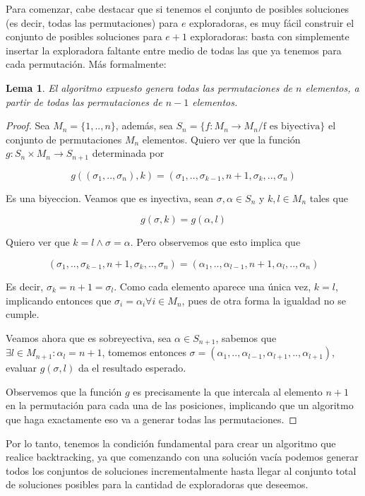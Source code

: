 \documentclass{article}
\newtheorem{lemma}{Lema}[theorem]
\theoremstyle{definition}
\theoremstyle{remark}
\begin{document}
Para comenzar, cabe destacar que si tenemos el conjunto de posibles soluciones (es decir, todas las permutaciones) para $e$ exploradoras, es muy fácil construir el conjunto de posibles soluciones para $e+1$ exploradoras: basta con simplemente insertar la exploradora faltante entre medio de todas las que ya tenemos para cada permutación. Más formalmente:

\begin{lemma}
El algoritmo expuesto genera todas las permutaciones de $n$ elementos, a partir de todas las permutaciones de $n-1$ elementos.
\end{lemma}

\begin{proof}
Sea $M_n = \{1, .., n\}$, además, sea $S_n = \{ f : M_n \to M_n / \text{f es biyectiva}\}$ el conjunto de permutaciones $M_n$ elementos. Quiero ver que la función $g : S_n \times M_n \to S_{n+1}$ determinada por

$$g((\sigma_1, .., \sigma_n), k) = (\sigma_1, .., \sigma_{k-1}, n+1, \sigma_k, .., \sigma_n)$$

Es una biyeccion. Veamos que es inyectiva, sean $\sigma, \alpha \in S_n$ y $k, l \in M_n$ tales que

$$g(\sigma, k) = g(\alpha, l)$$

Quiero ver que $k = l \wedge \sigma = \alpha$. Pero observemos que esto implica que

$$(\sigma_1, .., \sigma_{k-1}, n+1, \sigma_k, .., \sigma_n) = (\alpha_1, .., \alpha_{l-1}, n+1, \alpha_l, .., \alpha_n)$$

Es decir, $\sigma_k = n + 1 = \sigma_l$. Como cada elemento aparece una única vez, $k = l$, implicando entonces que $\sigma_i = \alpha_i \forall i \in M_n$, pues de otra forma la igualdad no se cumple.

Veamos ahora que es sobreyectiva, sea $\alpha \in S_{n+1}$, sabemos que $\exists l \in M_{n+1} : \alpha_l = n+1$, tomemos entonces $\sigma = (\alpha_1, .., \alpha_{l-1}, \alpha_{l+1}, .., \alpha_{l+1})$, evaluar $g(\sigma, l)$ da el resultado esperado.

Observemos que la función $g$ es precisamente la que intercala al elemento $n+1$ en la permutación para cada una de las posiciones, implicando que un algoritmo que haga exactamente eso va a generar todas las permutaciones.
\end{proof}

Por lo tanto, tenemos la condición fundamental para crear un algoritmo que realice backtracking, ya que comenzando con una solución vacía podemos generar todos los conjuntos de soluciones incrementalmente hasta llegar al conjunto total de soluciones posibles para la cantidad de exploradoras que deseemos.
\end{document}
